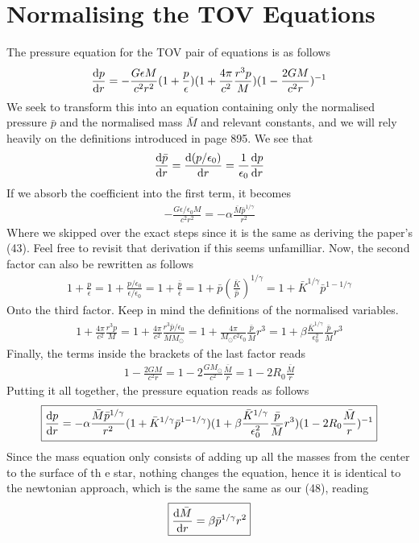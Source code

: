 \documentclass{article}
\begin{document}
\section*{Normalising the TOV Equations}
The pressure equation for the TOV pair of equations is as follows 
\begin{align}
    \dv{p}{r}=-\frac{G\epsilon M}{c^2r^2}(1+\frac{p}{\epsilon})(1+\frac{4\pi}{c^2}\frac{r^3p}{M})(1-\frac{2GM}{c^2r})^{-1}
\end{align}
We seek to transform this into an equation containing only the normalised pressure $\bar{p}$ and the normalised mass $\bar{M}$ and relevant constants, 
and we will rely heavily on the definitions introduced in page 895. We see that 
\begin{align}
    \dv{\bar{p}}{r}=\dv{(p/\epsilon_0)}{r}=\frac{1}{\epsilon_0}\dv{p}{r}
\end{align}
If we absorb the coefficient into the first term, it becomes 
\begin{align}
    -\frac{G\epsilon/\epsilon_0 M}{c^2r^2}=-\alpha\frac{\bar{M}\bar{p}^{1/\gamma}}{r^2}
\end{align}
Where we skipped over the exact steps since it is the same as deriving the paper's 
(43). Feel free to 
revisit that derivation if this seems unfamilliar. Now, the second factor can also be rewritten as follows
\begin{align}
    1+\frac{p}{\epsilon}=1+\frac{p/\epsilon_0}{\epsilon/\epsilon_0}=1+\frac{\bar{p}}{\bar{\epsilon}}=1+\bar{p}(\frac{\bar{K}}{\bar{p}})^{1/\gamma}=1+\bar{K}^{1/\gamma}\bar{p}^{1-1/\gamma}
\end{align}
Onto the third factor. Keep in mind the definitions of the normalised variables. 
\begin{align}
    1+\frac{4\pi}{c^2}\frac{r^3p}{M}=1+\frac{4\pi}{c^2}\frac{r^3\bar{p}/\epsilon_0}{\bar{M}M_{\odot}}=1+\frac{4\pi}{M_{\odot}c^2\epsilon_0}\frac{\bar{p}}{\bar{M}}r^3=1+\beta\frac{\bar{K}^{1/\gamma}}{\epsilon_0^2}\frac{\bar{p}}{\bar{M}}r^3
\end{align}
Finally, the terms inside the brackets of the last factor reads
\begin{align}
    1-\frac{2GM}{c^2r}=1-2\frac{GM_{\odot}}{c^2}\frac{\bar{M}}{r}=1-2R_0\frac{\bar{M}}{r}
\end{align}
Putting it all together, the pressure equation reads as follows 
\begin{align}
\boxed{    \dv{p}{r}=-\alpha\frac{\bar{M}\bar{p}^{1/\gamma}}{r^2}(1+\bar{K}^{1/\gamma}\bar{p}^{1-1/\gamma})(1+\beta\frac{\bar{K}^{1/\gamma}}{\epsilon_0^2}\frac{\bar{p}}{\bar{M}}r^3)(1-2R_0\frac{\bar{M}}{r})^{-1}
}\end{align}
Since the mass equation only consists of adding up all the masses from the center to the surface of th e
star, nothing changes the equation, hence it is identical to the newtonian approach, 
which is the same 
the same as our (48), reading 
\begin{align}
    \boxed{\dv{\bar{M}}{r}=\beta\bar{p}^{1/\gamma}r^2}
\end{align}
\end{document}
